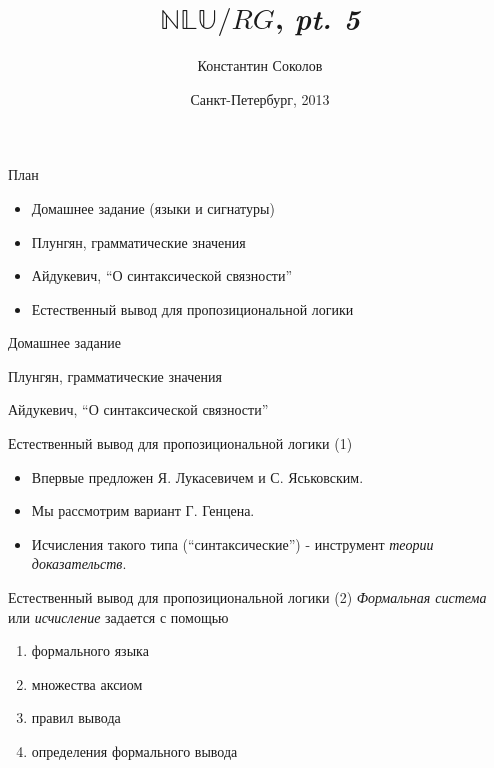 \documentclass{beamer}
\begin{document}
\title{\huge{$\mathbb{NLU}/RG$, \textit{pt. 5}}}
\author{Константин Соколов}
\date{Санкт-Петербург, 2013} 
\begin{frame}
    \thispagestyle{empty}
    \titlepage
\end{frame}

\begin{frame}{План}
    \setcounter{framenumber}{1}
    \begin{itemize}
        \item Домашнее задание (языки и сигнатуры)
        \item Плунгян, грамматические значения
        \item Айдукевич, ``О синтаксической связности''
        \item Естественный вывод для пропозициональной логики
    \end{itemize}
\end{frame}

\begin{frame}{Домашнее задание}
\end{frame}

\begin{frame}{Плунгян, грамматические значения}
\end{frame}

\begin{frame}{Айдукевич, ``О синтаксической связности''}
\end{frame}

\begin{frame}{Естественный вывод для пропозициональной логики (1)}
\begin{itemize}
  \item Впервые предложен Я. Лукасевичем и С. Яськовским.
  \item Мы рассмотрим вариант Г. Генцена.
  \item Исчисления такого типа (``синтаксические'') - инструмент \textit{теории доказательств}.
\end{itemize}
\end{frame}

\begin{frame}{Естественный вывод для пропозициональной логики (2)}
\textit{Формальная система} или \textit{исчисление} задается с помощью
\begin{enumerate}
  \item формального языка
  \item множества аксиом
  \item правил вывода
  \item определения формального вывода
\end{enumerate}
\end{frame}
\end{document}
